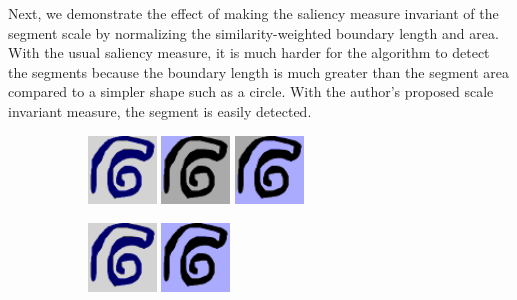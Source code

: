 \documentclass[12pt]{article}%
\begin{document}
Next, we demonstrate the effect of making the saliency measure invariant of the segment scale by normalizing the similarity-weighted boundary length and area. With the usual saliency measure, it is much harder for the algorithm to detect the segments because the boundary length is much greater than the segment area compared to a simpler shape such as a circle. With the author's proposed scale invariant measure, the segment is easily detected.\\

\begin{figure}[ht]

\begin{subfigure}[b]{\textwidth}
\centering
\includegraphics[width=0.2\textwidth,height=0.2\textwidth]{spiral_bad_seg_1.png} \hspace{.45cm}
\includegraphics[width=0.2\textwidth,height=0.2\textwidth]{spiral_bad_seg_2.png} \hspace{.45cm}
\includegraphics[width=0.2\textwidth,height=0.2\textwidth]{spiral_bad_seg_3.png}
\end{subfigure}

\vspace{.45cm}

\begin{subfigure}[b]{\textwidth}
\centering
\includegraphics[width=0.2\textwidth,height=0.2\textwidth]{spiral_good_seg_1.png} \hspace{.45cm}
\includegraphics[width=0.2\textwidth,height=0.2\textwidth]{spiral_good_seg_2.png}
\end{subfigure}


\end{figure}
\end{document}
